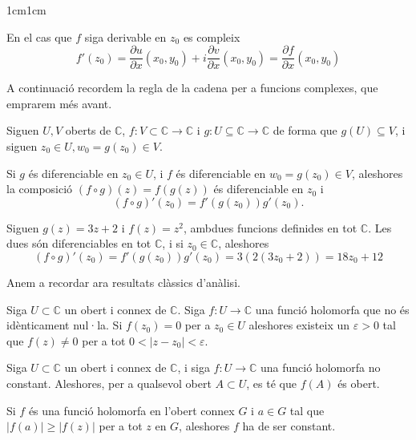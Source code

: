 \begin{adjustwidth}{1cm}{1cm}
\begin{teorema}
    En el cas que $f$ siga derivable en $z_0$ es compleix
    \[
        f'(z_0)=\frac{\partial u}{\partial x}(x_0,y_0)+i\frac{\partial v}{\partial x}(x_0,y_0)=\frac{\partial f}{\partial x}(x_0,y_0)
    \]
    \label{cauchy_riemann}
\end{teorema}

A continuació recordem la regla de la cadena per a funcions complexes, que emprarem més avant.

\begin{teorema}
    Siguen $U,V$ oberts de $\mathbb{C}$, $f:V\subset \mathbb{C}\to \mathbb{C}$ i $g:U\subseteq \mathbb{C}\to \mathbb{C}$ de forma que $g(U)\subseteq V$, i siguen $z_0\in U, w_0=g(z_0)\in V$.

    Si $g$ és diferenciable en $z_0\in U$, i $f$ és diferenciable en $w_0=g(z_0)\in V$, aleshores la composició $(f \circ g)(z) = f(g(z))$ és diferenciable en $z_0$ i 
    \begin{equation}
        (f \circ g)'(z_0) = f'(g(z_0))g'(z_0).
    \end{equation}
    \label{reglacadena}
\end{teorema}

\begin{exemple}
    Siguen $g(z)=3z+2$ i $f(z)=z^2$, ambdues funcions definides en tot $\mathbb{C}$. Les dues són diferenciables en tot $\mathbb{C}$, i si $z_0\in \mathbb{C}$, aleshores 
    \[
        (f\circ g)'(z_0)=f'(g(z_0))g'(z_0)=3(2(3z_0+2))=18z_0+12
    \]
\end{exemple}

Anem a recordar ara resultats clàssics d'anàlisi.

\begin{teorema}
    Siga $U\subset \mathbb{C}$ un obert i connex de $\mathbb{C}$. Siga $f:U\to \mathbb{C}$ una funció holomorfa que no és idènticament nul·la. Si $f(z_0)=0$ per a $z_0\in U$ aleshores existeix un $\varepsilon>0$ tal que $f(z)\neq 0$ per a tot $0<|z-z_0|<\varepsilon$.
    \label{zeros_aillats}
\end{teorema}

\begin{teorema}
    Siga $U\subset \mathbb{C}$ un obert i connex de $\mathbb{C}$, i siga $f:U\to \mathbb{C}$ una funció holomorfa no constant. Aleshores, per a qualsevol obert $A\subset U$, es té que $f(A)$ és obert.
    \label{teo_apl_oberta}
\end{teorema}

\begin{teorema}
        Si $f$ és una funció holomorfa en l'obert connex $G$ i $a\in G$ tal que $|f(a)|\geq |f(z)|$ per a tot $z$ en $G$, aleshores $f$ ha de ser constant.
        \label{teo_mod_max}
    \end{teorema}


\end{adjustwidth}
